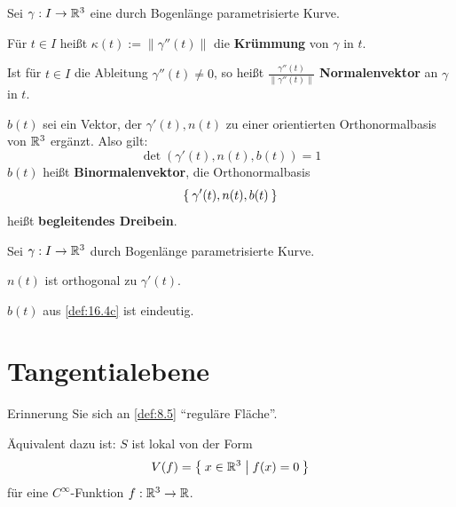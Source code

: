 \begin{definition}%
    Sei $\gamma: I \rightarrow \mathbb{R}^3$ eine durch Bogenlänge parametrisierte
    Kurve.

    \begin{defenum}
        \item Für $t \in I$ heißt $\kappa(t) := \|\gamma''(t)\|$ die
              \textbf{Krümmung} von $\gamma$ in $t$.
        \item Ist für $t \in I$ die Ableitung $\gamma''(t) \neq 0$,
              so heißt $\frac{\gamma''(t)}{\|\gamma''(t)\|}$ \textbf{Normalenvektor}
              an $\gamma$ in $t$.
        \item \label{def:16.4c} $b(t)$ sei ein Vektor, der $\gamma'(t), n(t)$
              zu einer orientierten Orthonormalbasis von $\mathbb{R}^3$ ergänzt.
              Also gilt:
              \[\det(\gamma'(t), n(t), b(t)) = 1\]
              $b(t)$ heißt \textbf{Binormalenvektor},
              die Orthonormalbasis 
              \[\Set{\gamma'(t), n(t), b(t)}\]
              heißt \textbf{begleitendes Dreibein}.
    \end{defenum}
\end{definition}

\begin{bemerkung}%
    Sei $\gamma: I \rightarrow \mathbb{R}^3$ durch Bogenlänge parametrisierte
    Kurve.

    \begin{bemenum}
        \item $n(t)$ ist orthogonal zu $\gamma'(t)$.
        \item $b(t)$ aus \cref{def:16.4c} ist eindeutig.
    \end{bemenum}
\end{bemerkung}

\section{Tangentialebene}
Erinnerung Sie sich an \cref{def:8.5} \enquote{reguläre Fläche}.

Äquivalent dazu ist: $S$ ist lokal von der Form
\[V(f) = \Set{x \in \ensuremath{\mathbb{R}}^3 | f(x) = 0 }\]
für eine $C^\infty$-Funktion $f: \mathbb{R}^3 \rightarrow \mathbb{R}$.

